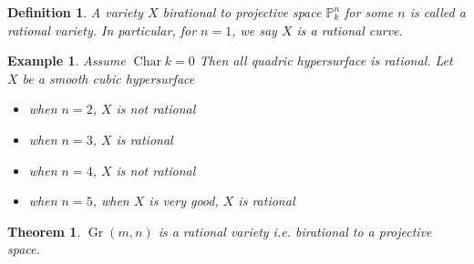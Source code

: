 \documentclass{ctexart}
\newtheorem{definition}{Definition}[section]
\newtheorem{theorem}{Theorem}[section]
\newtheorem{example}{Example}[section]
\newcommand{\characteristic}{\operatorname{Char}}
\newcommand{\grassmannianscheme}[2]{\operatorname{Gr}(#1, #2)}
\begin{document}
\begin{definition}
    A variety $X$ birational to projective space $\mathbb{P}_{k}^{n}$ for some $n$ is called a rational variety.
    In particular, for $n = 1$, we say $X$ is a rational curve.
\end{definition}
\begin{example}
    Assume $\characteristic k = 0$
    Then all quadric hypersurface is rational.
    Let $X$ be a smooth cubic hypersurface
    \begin{itemize}
        \item when $n = 2$, $X$ is not rational
        \item when $n = 3$, $X$ is rational
        \item when $n = 4$, $X$ is not rational
        \item when $n = 5$, when $X$ is very good, $X$ is rational
    \end{itemize}
\end{example}
\begin{theorem}
    $\grassmannianscheme{m}{n}$ is a rational variety i.e. birational to a projective space.
    \label{Theorem 6.2}
\end{theorem}
\end{document}
